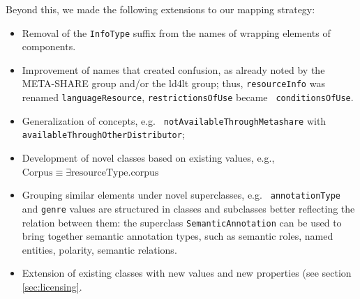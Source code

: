 \documentclass{llncs}
\begin{document}
{Beyond this, we made the following extensions to our mapping strategy:
\begin{itemize}
    \item Removal of the {\tt InfoType} suffix from the names of  wrapping elements of
        components.
    \item Improvement of names that created confusion, as already noted by the
        META-SHARE group and/or the ld4lt group; thus, {\tt resourceInfo} was renamed
        {\tt languageResource}, {\tt restrictionsOfUse} became {\tt
        conditionsOfUse}.
    \item Generalization of concepts, e.g. {\tt
        not\-Available\-Through\-Metashare} with {\tt
        available\-Through\-Other\-Distributor};
\item Development of novel classes based on existing values, e.g., \\$\mathrm{Corpus} \equiv \exists \mathrm{resourceType}.\mathrm{corpus}$
\item Grouping similar elements under novel superclasses, e.g. {\tt
    annotationType} and {\tt genre} values are structured in classes and
    subclasses better reflecting the relation between them: the superclass
    {\tt SemanticAnnotation} can be used to bring together semantic annotation types,
    such as semantic roles, named entities, polarity, semantic relations.
\item Extension of existing classes with new values and new properties
    (see section \ref{sec:licensing}.
\end{itemize}

}
\end{document}

